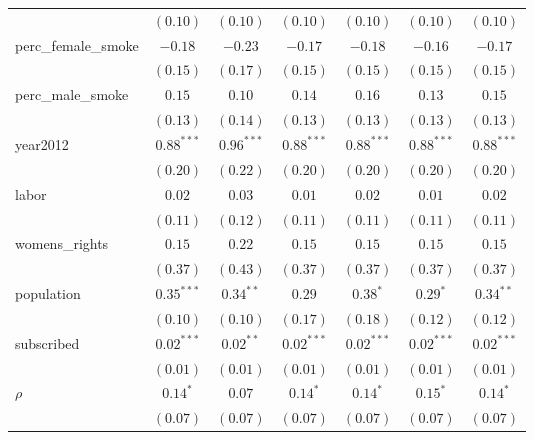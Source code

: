 \begin{table}[!h]
\begin{center}
\begin{tabular}{l c c c c c c }
                        & $(0.10)$     & $(0.10)$     & $(0.10)$     & $(0.10)$     & $(0.10)$     & $(0.10)$     \\
perc\_female\_smoke     & $-0.18$      & $-0.23$      & $-0.17$      & $-0.18$      & $-0.16$      & $-0.17$      \\
                        & $(0.15)$     & $(0.17)$     & $(0.15)$     & $(0.15)$     & $(0.15)$     & $(0.15)$     \\
perc\_male\_smoke       & $0.15$       & $0.10$       & $0.14$       & $0.16$       & $0.13$       & $0.15$       \\
                        & $(0.13)$     & $(0.14)$     & $(0.13)$     & $(0.13)$     & $(0.13)$     & $(0.13)$     \\
year2012                & $0.88^{***}$ & $0.96^{***}$ & $0.88^{***}$ & $0.88^{***}$ & $0.88^{***}$ & $0.88^{***}$ \\
                        & $(0.20)$     & $(0.22)$     & $(0.20)$     & $(0.20)$     & $(0.20)$     & $(0.20)$     \\
labor                   & $0.02$       & $0.03$       & $0.01$       & $0.02$       & $0.01$       & $0.02$       \\
                        & $(0.11)$     & $(0.12)$     & $(0.11)$     & $(0.11)$     & $(0.11)$     & $(0.11)$     \\
womens\_rights          & $0.15$       & $0.22$       & $0.15$       & $0.15$       & $0.15$       & $0.15$       \\
                        & $(0.37)$     & $(0.43)$     & $(0.37)$     & $(0.37)$     & $(0.37)$     & $(0.37)$     \\
population              & $0.35^{***}$ & $0.34^{**}$  & $0.29$       & $0.38^{*}$   & $0.29^{*}$   & $0.34^{**}$  \\
                        & $(0.10)$     & $(0.10)$     & $(0.17)$     & $(0.18)$     & $(0.12)$     & $(0.12)$     \\
subscribed              & $0.02^{***}$ & $0.02^{**}$  & $0.02^{***}$ & $0.02^{***}$ & $0.02^{***}$ & $0.02^{***}$ \\
                        & $(0.01)$     & $(0.01)$     & $(0.01)$     & $(0.01)$     & $(0.01)$     & $(0.01)$     \\
$\rho$                  & $0.14^{*}$   & $0.07$       & $0.14^{*}$   & $0.14^{*}$   & $0.15^{*}$   & $0.14^{*}$   \\
                        & $(0.07)$     & $(0.07)$     & $(0.07)$     & $(0.07)$     & $(0.07)$     & $(0.07)$     \\

\end{tabular}
\end{center}
\end{table}
